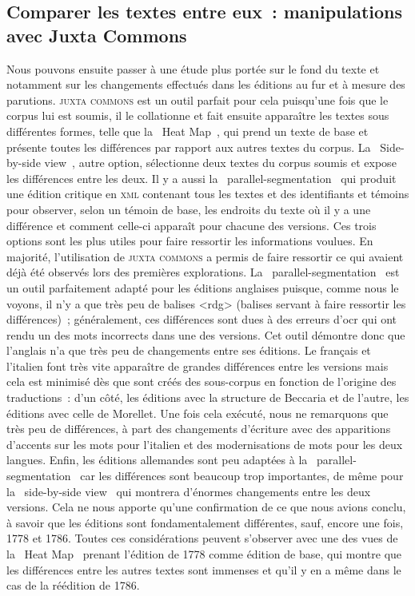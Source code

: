 \subsection{Comparer les textes entre eux~: manipulations avec Juxta Commons}
Nous pouvons ensuite passer à une étude plus portée sur le fond du texte et notamment sur les changements effectués dans les éditions au fur et à mesure des parutions. \textsc{juxta commons} est un outil parfait pour cela puisqu'une fois que le corpus lui est soumis, il le collationne et fait ensuite apparaître les textes sous différentes formes, telle que la \og~Heat Map~\fg{}, qui prend un texte de base et présente toutes les différences par rapport aux autres textes du corpus. La \og~Side-by-side view~\fg{}, autre option, sélectionne deux textes du corpus soumis et expose les différences entre les deux. Il y a aussi la \og~parallel-segmentation~\fg{} qui produit une édition critique en \textsc{xml} contenant tous les textes et des identifiants et témoins pour observer, selon un témoin de base, les endroits du texte où il y a une différence et comment celle-ci apparaît pour chacune des versions. Ces trois options sont les plus utiles pour faire ressortir les informations voulues. En majorité, l'utilisation de \textsc{juxta commons} a permis de faire ressortir ce qui avaient déjà été observés lors des premières explorations. La \og~parallel-segmentation~\fg{} est un outil parfaitement adapté pour les éditions anglaises puisque, comme nous le voyons, il n'y a que très peu de balises <rdg> (balises servant à faire ressortir les différences)~; généralement, ces différences sont dues à des erreurs d'\acrshort{ocr} qui ont rendu un des mots incorrects dans une des versions. Cet outil démontre donc que l'anglais n'a que très peu de changements entre ses éditions. Le français et l'italien font très vite apparaître de grandes différences entre les versions mais cela est minimisé dès que sont créés des sous-corpus en fonction de l'origine des traductions~: d'un côté, les éditions avec la structure de Beccaria et de l'autre, les éditions avec celle de Morellet. Une fois cela exécuté, nous ne remarquons que très peu de différences, à part des changements d'écriture avec des apparitions d'accents sur les mots pour l'italien et des modernisations de mots pour les deux langues. Enfin, les éditions allemandes sont peu adaptées à la \og~parallel-segmentation~\fg{} car les différences sont beaucoup trop importantes, de même pour la \og~side-by-side view~\fg{} qui montrera d'énormes changements entre les deux versions. Cela ne nous apporte qu'une confirmation de ce que nous avions conclu, à savoir que les éditions sont fondamentalement différentes, sauf, encore une fois, 1778 et 1786. Toutes ces considérations peuvent s'observer avec une des vues de la \og~Heat Map~\fg{} prenant l'édition de 1778 comme édition de base, qui montre que les différences entre les autres textes sont immenses et qu'il y en a même dans le cas de la réédition de 1786.
